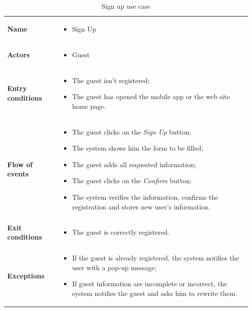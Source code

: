 \begin{table}
\begin{center}
\begin{tabular}{lp{}}
\toprule
\textbf{Name}		&	\begin{itemize}
					\item Sign Up
					\end{itemize}	\\
\textbf{Actors}		&	\begin{itemize}
					\item Guest
					\end{itemize}	\\
\textbf{Entry conditions}	&	\begin{itemize}
					\item The guest isn't registered;
					\item The guest has opened the mobile app or the web site home page.
					\end{itemize}	\\
\textbf{Flow of events}	&	\begin{itemize}
					\item	The guest clicks on the \emph{Sign Up} button;
					\item	The system shows him the form to be filled;
					\item	The guest adds all requested information;
					\item	The guest clicks on the \emph{Confirm} button;
					\item	The system verifies the information, confirms the registration and stores new user's information.
					\end{itemize}	\\
\textbf{Exit conditions}	&	\begin{itemize}
					\item	The guest is correctly registered.
					\end{itemize}	\\
\textbf{Exceptions}	&	\begin{itemize}
					\item If the guest is already registered, the system notifies the user with a pop-up message;
					\item	If guest information are incomplete or incorrect, the system notifies the guest and asks him to rewrite them.
					\end{itemize}	\\
\bottomrule
\end{tabular}
\caption{Sign up use case}
\end{center}
\end{table}

